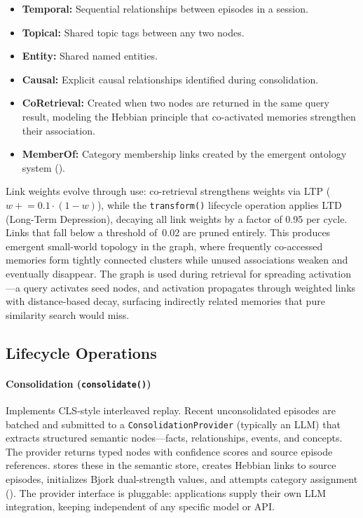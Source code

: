 \begin{itemize}[nosep]
    \item \textbf{Temporal:} Sequential relationships between episodes in a
    session.
    \item \textbf{Topical:} Shared topic tags between any two nodes.
    \item \textbf{Entity:} Shared named entities.
    \item \textbf{Causal:} Explicit causal relationships identified during
    consolidation.
    \item \textbf{CoRetrieval:} Created when two nodes are returned in the
    same query result, modeling the Hebbian principle that co-activated
    memories strengthen their association.
    \item \textbf{MemberOf:} Category membership links created by the
    emergent ontology system ().
\end{itemize}

Link weights evolve through use: co-retrieval strengthens weights via LTP
($w \mathrel{+}= 0.1 \cdot (1 - w)$), while the \texttt{transform()}
lifecycle operation applies LTD (Long-Term Depression), decaying all link
weights by a factor of 0.95 per cycle. Links that fall below a threshold
of~0.02 are pruned entirely. This produces emergent small-world topology
in the graph, where frequently co-accessed memories form tightly connected
clusters while unused associations weaken and eventually disappear. The graph is used during retrieval for spreading
activation---a query activates seed nodes, and activation propagates through
weighted links with distance-based decay, surfacing indirectly related
memories that pure similarity search would miss.

\subsection{Lifecycle Operations}
\label{sec:lifecycle}

\paragraph{Consolidation (\texttt{consolidate()})}
Implements CLS-style interleaved replay. Recent unconsolidated episodes are
batched and submitted to a \texttt{ConsolidationProvider} (typically an LLM)
that extracts structured semantic nodes---facts, relationships, events, and
concepts. The provider returns typed nodes with confidence scores and source
episode references. \alaya{} stores these in the semantic store, creates
Hebbian links to source episodes, initializes Bjork dual-strength values,
and attempts category assignment (). The provider
interface is pluggable: applications supply their own LLM integration,
keeping \alaya{} independent of any specific model or API.

